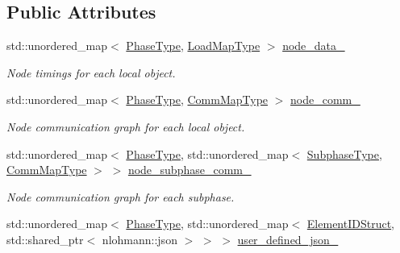 \subsection*{Public Attributes}
\begin{DoxyCompactItemize}
\item 
std\+::unordered\+\_\+map$<$ \hyperlink{namespacevt_a46ce6733d5cdbd735d561b7b4029f6d7}{Phase\+Type}, \hyperlink{namespacevt_1_1vrt_1_1collection_1_1balance_a5339303db2e1ce964d783a53fd74e6b1}{Load\+Map\+Type} $>$ \hyperlink{structvt_1_1vrt_1_1collection_1_1balance_1_1_l_b_data_holder_a946b456d5de23d9a00e91c1dcc12699f}{node\+\_\+data\+\_\+}
\begin{DoxyCompactList}\small\item\em Node timings for each local object. \end{DoxyCompactList}\item 
std\+::unordered\+\_\+map$<$ \hyperlink{namespacevt_a46ce6733d5cdbd735d561b7b4029f6d7}{Phase\+Type}, \hyperlink{namespacevt_1_1vrt_1_1collection_1_1balance_a01ee1fb0ae2da1d2ab7fdca3be9ae351}{Comm\+Map\+Type} $>$ \hyperlink{structvt_1_1vrt_1_1collection_1_1balance_1_1_l_b_data_holder_a627c83ae5c9add8cfb626a42d6031612}{node\+\_\+comm\+\_\+}
\begin{DoxyCompactList}\small\item\em Node communication graph for each local object. \end{DoxyCompactList}\item 
std\+::unordered\+\_\+map$<$ \hyperlink{namespacevt_a46ce6733d5cdbd735d561b7b4029f6d7}{Phase\+Type}, std\+::unordered\+\_\+map$<$ \hyperlink{namespacevt_ae78cbfdf1e57470e33eedb074f2beeba}{Subphase\+Type}, \hyperlink{namespacevt_1_1vrt_1_1collection_1_1balance_a01ee1fb0ae2da1d2ab7fdca3be9ae351}{Comm\+Map\+Type} $>$ $>$ \hyperlink{structvt_1_1vrt_1_1collection_1_1balance_1_1_l_b_data_holder_a733c6d7b9fb2bb0c67588eed9b9cd5fc}{node\+\_\+subphase\+\_\+comm\+\_\+}
\begin{DoxyCompactList}\small\item\em Node communication graph for each subphase. \end{DoxyCompactList}\item 
std\+::unordered\+\_\+map$<$ \hyperlink{namespacevt_a46ce6733d5cdbd735d561b7b4029f6d7}{Phase\+Type}, std\+::unordered\+\_\+map$<$ \hyperlink{namespacevt_1_1vrt_1_1collection_1_1balance_a9f5b53fafb270212279a4757d2c4cd28}{Element\+I\+D\+Struct}, std\+::shared\+\_\+ptr$<$ nlohmann\+::json $>$ $>$ $>$ \hyperlink{structvt_1_1vrt_1_1collection_1_1balance_1_1_l_b_data_holder_a38dc8aada18756357212f4229ea363da}{user\+\_\+defined\+\_\+json\+\_\+}

\end{DoxyCompactItemize}
